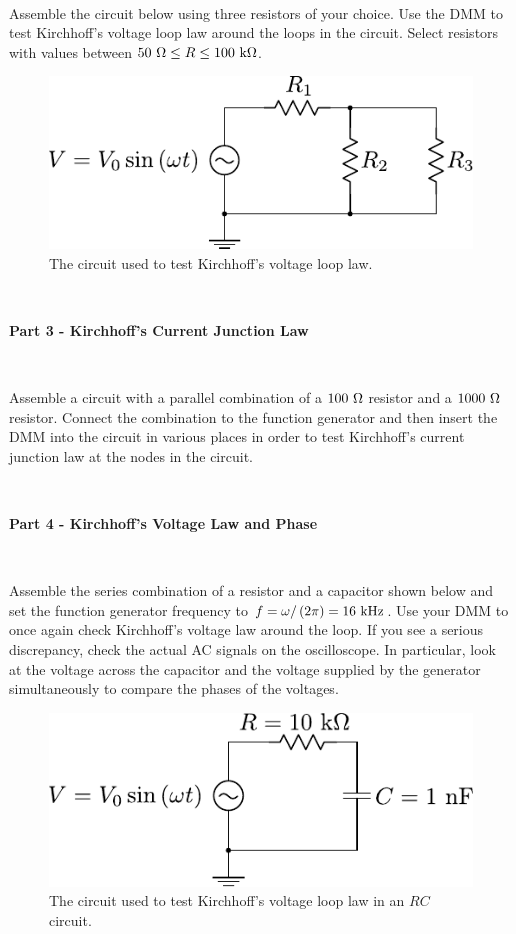 \documentclass[12pt,oneside,openany,letterpaper]{article}
\begin{document}
~

\noindent Assemble the circuit below using three resistors of your choice. Use the DMM to test Kirchhoff’s voltage loop law around the loops in the circuit.  Select resistors with values between $50~\Omega\le R\le 100\rm\ k\Omega$.  

\begin{figure}[h!]
\begin{center}
\includegraphics[width=.5\textwidth]{figures/Lab2Fig2.pdf}\caption{\label{fig:fig2}The circuit used to test Kirchhoff's voltage loop law.}
\end{center}
\end{figure}


~


{\bf Part 3 - Kirchhoff's Current Junction Law}

~

\noindent Assemble a circuit with a parallel combination of a $100\rm\ \Omega$ resistor and a $1000\rm\ \Omega$ resistor.  Connect the combination to the function generator and then insert the DMM into the circuit in various places in order to test Kirchhoff’s current junction law at the nodes in the circuit.

~

{\bf Part 4 - Kirchhoff's Voltage Law and Phase}

~

\noindent Assemble the series combination of a resistor and a capacitor shown below and set the function generator frequency to $f = \omega/\left(2\pi\right) = 16\rm\ kHz$. Use your DMM to once again check Kirchhoff’s voltage law around the loop. If you see a serious discrepancy, check the actual AC signals on the oscilloscope. In particular, look at the voltage across the capacitor and the voltage supplied by the generator simultaneously to compare the phases of the voltages.

\begin{figure}[h!]
\begin{center}
\includegraphics[width=.5\textwidth]{figures/Lab2Fig3.pdf}\caption{\label{fig:fig3}The circuit used to test Kirchhoff's voltage loop law in an $RC$ circuit.}
\end{center}
\end{figure}
\end{document}
